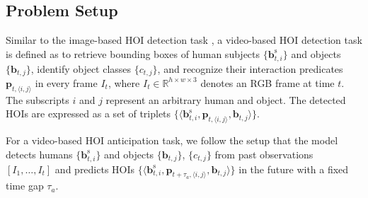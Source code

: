 \documentclass[times,twocolumn,final,authoryear]{elsarticle}
\begin{document}
\subsection{Problem Setup}
Similar to the image-based HOI detection task \citep{hoi_i2:visual_semantic, hoi_i2:detecting_recognizing}, a video-based HOI detection task is defined as to retrieve bounding boxes of human subjects $\{\mathbf{b}_{t,i}^\text{s}\}$ and objects $\{\mathbf{b}_{t,j}\}$, identify object classes $\{c_{t,j}\}$, and recognize their interaction predicates $\mathbf{p}_{t,\langle i,j \rangle}$ in every frame $I_t$, where $I_t \in \mathbb{R}^{h\times w\times 3}$ denotes an RGB frame at time $t$. The subscripts $i$ and $j$ represent an arbitrary human and object. The detected HOIs are expressed as a set of triplets $\{\langle \mathbf{b}_{t,i}^\text{s}, \mathbf{p}_{t,\langle i,j \rangle}, \mathbf{b}_{t,j} \rangle\}$. 

For a video-based HOI anticipation task, we follow the setup that the model detects humans $\{\mathbf{b}_{t,i}^\text{s}\}$ and objects $\{\mathbf{b}_{t,j}\}$, $\{c_{t,j}\}$ from past observations $[I_1, \dots, I_{t}]$ and predicts HOIs $\{\langle \mathbf{b}_{t,i}^\text{s}, \mathbf{p}_{t+\tau_a,\langle i,j \rangle}, \mathbf{b}_{t,j} \rangle\}$ in the future with a fixed time gap $\tau_a$.
\end{document}
